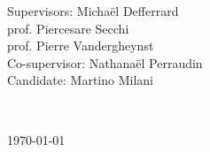\begin{titlepage}
\begin{minipage}{1\textwidth}
	\begin{flushleft} \large
		Supervisors: \hspace{0.3cm} Micha\"el Defferrard\\
		\hspace{3.2cm} prof. Piercesare Secchi\\
		\hspace{3.2cm} prof. Pierre Vandergheynst\\
		Co-supervisor:  Nathana\"el Perraudin\\
		\vspace{1cm}
		Candidate: \hspace{0.55cm} Martino Milani
		\end{flushleft}
	\vspace{2cm}
\end{minipage}
~

{\large \today } %
\vspace{1cm}
\end{titlepage}